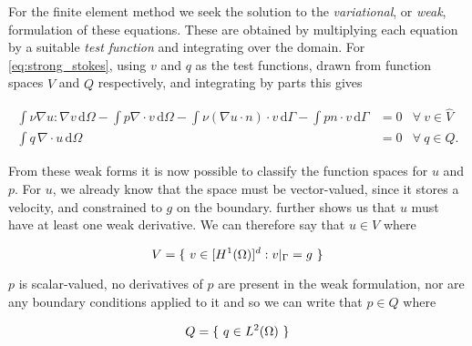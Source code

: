 \documentclass[thesis]{subfiles}
\begin{document}

For the finite element method we seek the solution to the \textit{variational}, or \textit{weak}, formulation of these equations.
These are obtained by multiplying each equation by a suitable \textit{test function} and integrating over the domain.
For \cref{eq:strong_stokes}, using $v$ and $q$ as the test functions, drawn from function spaces $\hat V$ and $Q$ respectively, and integrating by parts this gives

\begin{subequations}
  \begin{align}
    \int \nu \nabla u : \nabla v \, \textrm{d}\Omega
    - \int p \nabla \cdot v \, \textrm{d}\Omega
    - \int \nu (\nabla u \cdot n) \cdot v \, \textrm{d}\Gamma
    - \int p n \cdot v \, \textrm{d}\Gamma
    &= 0
    &\forall \ v \in \hat V
    \label{eq:weak_stokes_extra_V} \\
    \int q \, \nabla \cdot u \, \textrm{d}\Omega
    &= 0
    &\forall \ q \in Q.
    \label{eq:weak_stokes_extra_Q}
  \end{align}
  \label{eq:weak_stokes_extra}
\end{subequations}

From these weak forms it is now possible to classify the function spaces for $u$ and $p$.
For $u$, we already know that the space must be vector-valued, since it stores a velocity, and constrained to $g$ on the boundary.
 further shows us that $u$ must have at least one weak derivative.
We can therefore say that $u \in V$ where

\begin{equation}
  V = \{ \ v \in [H^1(\Omega)]^d : v |_{\Gamma} = g \ \}  \\
  \label{eq:stokes_velocity_space}
\end{equation}

$p$ is scalar-valued, no derivatives of $p$ are present in the weak formulation, nor are any boundary conditions applied to it and so we can write that $p \in Q$ where

\begin{equation}
  Q = \{ \ q \in L^2(\Omega) \ \}  \\
  \label{eq:stokes_pressure_space}
\end{equation}
\end{document}
